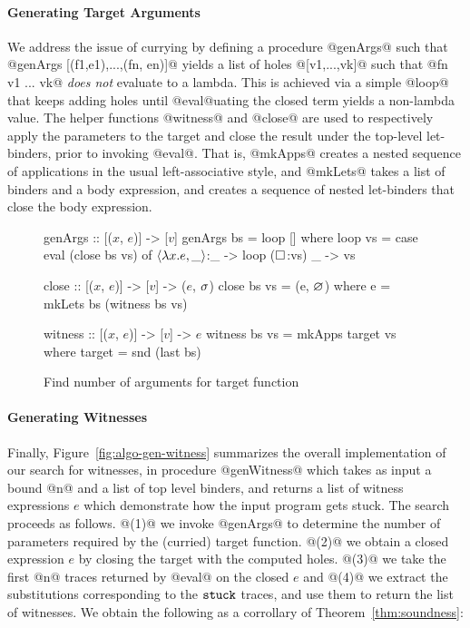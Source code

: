 \paragraph{Generating Target Arguments}
%
We address the issue of currying by defining a procedure @genArgs@ such that
@genArgs [(f1,e1),...,(fn, en)]@ yields a list of holes @[v1,...,vk]@
such that @fn v1 ... vk@ \emph{does not} evaluate to a lambda.
%
This is achieved via a simple @loop@ that keeps adding holes until
@eval@uating the closed term yields a non-lambda value.
%
The helper functions @witness@ and @close@ are used to respectively
apply the parameters to the target and close the result under the top-level
let-binders, prior to invoking @eval@.
%
That is, @mkApps@ creates a nested sequence of applications in
the usual left-associative style, and @mkLets@ takes a list of
binders and a body expression, and creates a sequence of nested
let-binders that close the body expression.

\begin{figure}[ht]
\centering
\begin{mcode}
genArgs :: [($x$, $e$)] -> [$v$]
genArgs bs = loop []
  where
  loop vs  = case eval (close bs vs) of
               $\langle \lambda x. e, \_ \rangle$:_ -> loop ($\square_{}$:vs)
               _        -> vs

close :: [($x$, $e$)] -> [$v$] -> ($e$, $\sigma$)
close bs vs = (e, $\varnothing$)
  where
    e       = mkLets bs (witness bs vs)

witness :: [($x$, $e$)] -> [$v$] -> $e$
witness bs vs = mkApps target vs
  where
    target    = snd (last bs)
\end{mcode}
\caption{Find number of arguments for target function}
\label{fig:algo-gen-args}
\end{figure}


\paragraph{Generating Witnesses}
%
Finally, Figure~\ref{fig:algo-gen-witness} summarizes the overall
implementation of our search for witnesses, in procedure @genWitness@
which takes as input a bound @n@ and a list of top level binders, and
returns a list of witness expressions $e$ which demonstrate how the input
program gets stuck.
%
The search proceeds as follows.
%
@(1)@ we invoke @genArgs@ to determine the number of parameters required
by the (curried) target function.
%
@(2)@ we obtain a closed expression $e$ by closing the target with the
computed holes.
%
@(3)@ we take the first @n@ traces returned by @eval@ on the closed $e$
and
@(4)@ we extract the substitutions corresponding to the $\mathtt{stuck}$ traces,
and use them to return the list of witnesses.
%
We obtain the following as a corrollary of Theorem~\ref{thm:soundness}:

